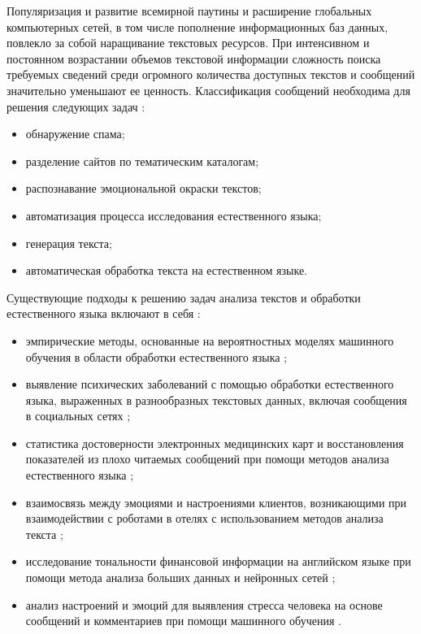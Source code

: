 Популяризация и развитие всемирной паутины и расширение глобальных компьютерных сетей, в том числе пополнение информационных баз данных, повлекло за собой наращивание текстовых ресурсов.
При интенсивном и постоянном возрастании объемов текстовой информации сложность поиска требуемых сведений среди огромного количества доступных текстов и сообщений значительно уменьшают ее ценность.
Классификация сообщений необходима для решения следующих задач \cite{classificationPromlems}:
\begin{itemize}
	\item обнаружение спама;
	\item разделение сайтов по тематическим каталогам;
	\item распознавание эмоциональной окраски текстов;
	\item автоматизация процесса исследования естественного языка;
	\item генерация текста;
	\item автоматическая обработка текста на естественном языке.
\end{itemize}

Существующие подходы к решению задач анализа текстов и обработки естественного языка включают в себя \cite{classificationPromlems}:

\begin{itemize}
	\item эмпирические методы, основанные на вероятностных моделях машинного обучения в области обработки естественного языка \cite{shit1};
	\item выявление психических заболеваний с помощью обработки естественного языка, выраженных в разнообразных текстовых данных, включая сообщения в социальных сетях \cite{shit2};
	\item статистика достоверности электронных медицинских карт и восстановления показателей из плохо читаемых сообщений при помощи методов анализа естественного языка \cite{shit3};
	\item взаимосвязь между эмоциями и настроениями клиентов, возникающими при взаимодействии с роботами в отелях с использованием методов анализа текста \cite{shit4};
	\item исследование тональности финансовой информации на английском языке при помощи метода анализа больших данных и нейронных сетей \cite{shit5};
	\item анализ настроений и эмоций для выявления стресса человека на основе сообщений и комментариев при помощи машинного обучения \cite{shit6}.
\end{itemize}

